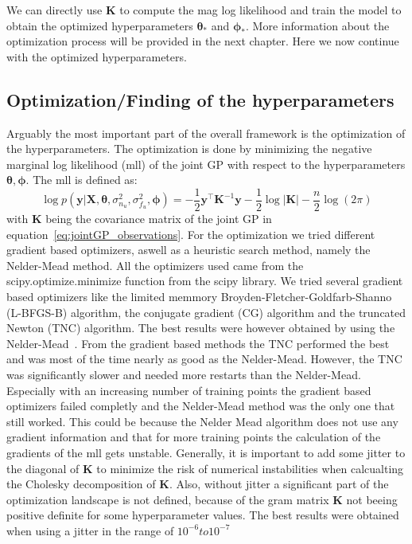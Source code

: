 \documentclass{article}
\begin{document}
We can directly use $\bm{K}$ to compute the mag log likelihood and train the
model to obtain the optimized hyperparameters $\bm{\theta_*}$ and
$\bm{\phi_*}$. More information about the optimization process will be provided
in the next chapter. Here we now continue with the optimized hyperparameters.

\subsection{Optimization/Finding of the hyperparameters}
Arguably the most important part of the overall framework is the optimization of the hyperparameters. The optimization is done by minimizing the negative marginal log likelihood (mll) of the joint GP with respect to the hyperparameters $\bm{\theta, \phi}$. The mll is defined as:
\begin{equation}
    \log p(\bm{y}|\bm{X},\bm{\theta},\sigma_{n_u}^2,\sigma_{f_u}^2,\bm{\phi}) =
    -\frac{1}{2}\bm{y}^\intercal \bm{K}^{-1}\bm{y} - \frac{1}{2}\log\left\lvert \bm{K}\right\rvert - \frac{n}{2}\log(2\pi)
\end{equation}
with $\bm{K}$ being the covariance matrix of the joint GP in equation~\ref{eq:jointGP_observations}. For the optimization we tried different gradient based optimizers, aswell as a heuristic search method, namely the Nelder-Mead method. All the optimizers used came from the scipy.optimize.minimize function from the scipy library. We tried several gradient based optimizers like the limited memmory Broyden-Fletcher-Goldfarb-Shanno (L-BFGS-B) algorithm, the conjugate gradient (CG) algorithm and the truncated Newton (TNC) algorithm. The best results were however obtained by using the Nelder-Mead~\cite{Singer:2009NelderMead}. From the gradient based methods the TNC performed the best and was most of the time nearly as good as the Nelder-Mead. However, the TNC was significantly slower and needed more restarts than the Nelder-Mead. Especially with an increasing number of training points the gradient based optimizers failed completly and the Nelder-Mead method was the only one that still worked. This could be because the Nelder Mead algorithm does not use any gradient information and that for more training points the calculation of the gradients of the mll gets unstable. Generally, it is important to add some jitter to the diagonal of $\bm{K}$ to minimize the risk of numerical instabilities when calcualting the Cholesky decomposition of $\bm{K}$. Also, without jitter a significant part of the optimization landscape is not defined, because of the  gram matrix $\bm{K}$ not beeing positive definite for some hyperparameter values. The best results were obtained when using a jitter in the range of $10^{-6} to 10^{-7}$\\
\end{document}

